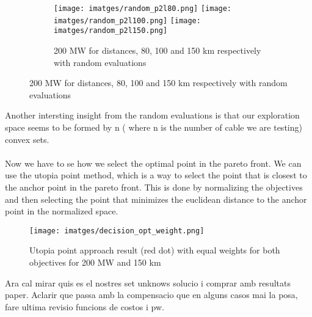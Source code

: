\documentclass{article}
\begin{document}
\begin{figure}[h]
  \begin{subfigure}{\linewidth}
  \texttt{[image: imatges/random\_p2l80.png]}\hfill
  \texttt{[image: imatges/random\_p2l100.png]}\hfill
  \texttt{[image: imatges/random\_p2l150.png]}
  \caption{200 MW for distances, 80, 100 and 150 km respectively with random evaluations}
  \end{subfigure}\par\medskip
  
\end{figure}
Another intersting insight from the random evaluations is that our exploration space seems to
be formed by n ( where n is the number of cable we are testing) convex sets.
\\
\\
Now we have to se how we select the optimal point in the pareto front. We can use the utopia point method,
which is a way to select the point that is closest to the anchor point in the pareto front. This is done
by normalizing the objectives and then selecting the point that minimizes the euclidean distance to the anchor point
in the normalized space.\\

\begin{figure}[h]
  \centering
  \texttt{[image: imatges/decision\_opt\_weight.png]}
  \caption{Utopia point approach result (red dot) with equal weights for both objectives for 200 MW and 150 km}
  
\end{figure}

Ara cal mirar quis es el nostres set unknows solucio i comprar amb resultats paper. Aclarir que passa amb la compensacio que en alguns
casos mai la posa, fare ultima revisio funcions de costos i pw.
  
\end{document}
